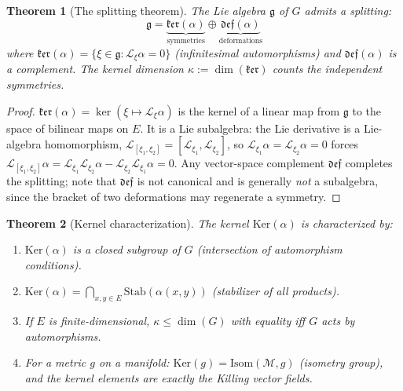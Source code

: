 \documentclass[12pt]{article}
\theoremstyle{plain}
\newtheorem{theorem}{Theorem}[section]
\theoremstyle{definition}
\theoremstyle{remark}
\newcommand{\Ker}{\mathrm{Ker}}
\newcommand{\Isom}{\mathrm{Isom}}
\begin{document}
\begin{theorem}[The splitting theorem]\label{thm:splitting}
The Lie algebra $\mathfrak{g}$ of $G$ admits a splitting:
\begin{equation}\label{eq:splitting}
\boxed{\mathfrak{g} = \underbrace{\mathfrak{ker}(\alpha)}_{\text{symmetries}} \oplus \underbrace{\mathfrak{def}(\alpha)}_{\text{deformations}}}
\end{equation}
where $\mathfrak{ker}(\alpha) = \{\xi \in \mathfrak{g} : \mathcal{L}_\xi\alpha = 0\}$ (infinitesimal automorphisms) and $\mathfrak{def}(\alpha)$ is a complement. The kernel dimension $\kappa := \dim(\mathfrak{ker})$ counts the independent symmetries.
\end{theorem}

\begin{proof}
$\mathfrak{ker}(\alpha) = \ker(\xi \mapsto \mathcal{L}_\xi\alpha)$ is the kernel of a linear map from $\mathfrak{g}$ to the space of bilinear maps on $E$. It is a Lie subalgebra: the Lie derivative is a Lie-algebra homomorphism,
$\mathcal L_{[\xi_1,\xi_2]}=[\mathcal L_{\xi_1},\mathcal L_{\xi_2}]$, so $\mathcal L_{\xi_1}\alpha=\mathcal L_{\xi_2}\alpha=0$
forces $\mathcal L_{[\xi_1,\xi_2]}\alpha=\mathcal L_{\xi_1}\mathcal L_{\xi_2}\alpha-\mathcal L_{\xi_2}\mathcal L_{\xi_1}\alpha=0$.
Any vector-space complement $\mathfrak{def}$ completes the splitting; note that $\mathfrak{def}$ is not canonical
and is generally \emph{not} a subalgebra, since the bracket of two deformations may regenerate a symmetry.
\end{proof}

\begin{theorem}[Kernel characterization]\label{thm:kernel-char}
The kernel $\Ker(\alpha)$ is characterized by:
\begin{enumerate}[label=(\alph*)]
    \item $\Ker(\alpha)$ is a closed subgroup of $G$ (intersection of automorphism conditions).
    \item $\Ker(\alpha) = \bigcap_{x,y \in E} \mathrm{Stab}(\alpha(x,y))$ (stabilizer of all products).
    \item If $E$ is finite-dimensional, $\kappa \leq \dim(G)$ with equality iff $G$ acts by automorphisms.
    \item For a metric $g$ on a manifold: $\Ker(g) = \Isom(\mathcal{M}, g)$ (isometry group), and the kernel elements are exactly the Killing vector fields.
\end{enumerate}
\end{theorem}
\end{document}
